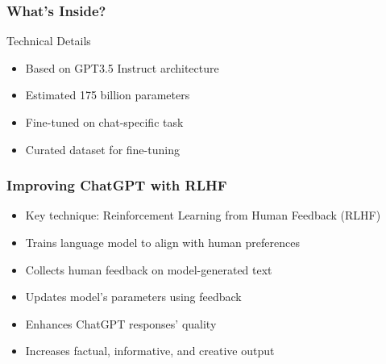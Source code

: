 

\begin{frame}[fragile]\frametitle{What's Inside?}
Technical Details
    \begin{itemize}
        \item Based on GPT3.5 Instruct architecture
        \item Estimated 175 billion parameters
        \item Fine-tuned on chat-specific task
        \item Curated dataset for fine-tuning
    \end{itemize}
	

\end{frame}

\begin{frame}[fragile]\frametitle{Improving ChatGPT with RLHF}
    \begin{itemize}
        \item Key technique: Reinforcement Learning from Human Feedback (RLHF)
        \item Trains language model to align with human preferences
        \item Collects human feedback on model-generated text
        \item Updates model's parameters using feedback
        \item Enhances ChatGPT responses' quality
        \item Increases factual, informative, and creative output
    \end{itemize}
\end{frame}

